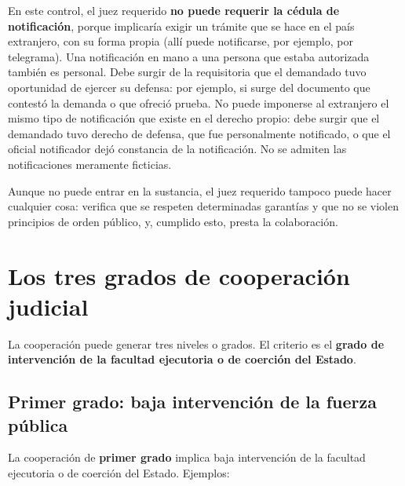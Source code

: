 \documentclass[12pt,oneside]{book}
\begin{document}
En este control, el juez requerido \textbf{no puede requerir la cédula de notificación}, porque implicaría exigir un trámite que se hace en el país extranjero, con su forma propia (allí puede notificarse, por ejemplo, por telegrama). Una notificación en mano a una persona que estaba autorizada también es personal. Debe surgir de la requisitoria que el demandado tuvo oportunidad de ejercer su defensa: por ejemplo, si surge del documento que contestó la demanda o que ofreció prueba. No puede imponerse al extranjero el mismo tipo de notificación que existe en el derecho propio: debe surgir que el demandado tuvo derecho de defensa, que fue personalmente notificado, o que el oficial notificador dejó constancia de la notificación. No se admiten las notificaciones meramente ficticias.


Aunque no puede entrar en la sustancia, el juez requerido tampoco puede hacer cualquier cosa: verifica que se respeten determinadas garantías y que no se violen principios de orden público, y, cumplido esto, presta la colaboración.

\section{Los tres grados de cooperación judicial}

La cooperación puede generar tres niveles o grados. El criterio es el \textbf{grado de intervención de la facultad ejecutoria o de coerción del Estado}.

\subsection{Primer grado: baja intervención de la fuerza pública}

La cooperación de \textbf{primer grado} implica baja intervención de la facultad ejecutoria o de coerción del Estado. Ejemplos:
\end{document}
